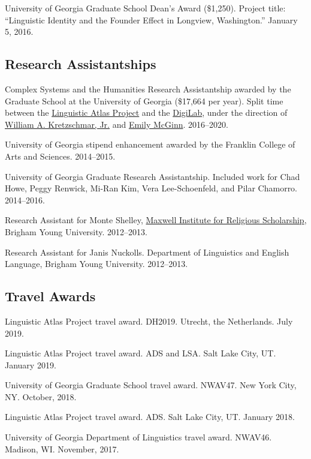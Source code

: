 \documentclass[
]{article}
\begin{document}
University of Georgia Graduate School Dean's Award (\$1,250). Project
title: ``Linguistic Identity and the Founder Effect in Longview,
Washington.'' January 5, 2016.

\hypertarget{research-assistantships}{%
\subsection{Research Assistantships}\label{research-assistantships}}

Complex Systems and the Humanities Research Assistantship awarded by the
Graduate School at the University of Georgia (\$17,664 per year). Split
time between the \href{http://www.lap.uga.edu}{Linguistic Atlas Project}
and the \href{http://digi.uga.edu/digilab/}{DigiLab}, under the
direction of
\href{https://www.english.uga.edu/directory/people/william-kretzschmar}{William
A. Kretzschmar, Jr.} and \href{https://emilymcginn.com}{Emily McGinn}.
2016--2020.

University of Georgia stipend enhancement awarded by the Franklin
College of Arts and Sciences. 2014--2015.

University of Georgia Graduate Research Assistantship. Included work for
Chad Howe, Peggy Renwick, Mi-Ran Kim, Vera Lee-Schoenfeld, and Pilar
Chamorro. 2014--2016.

Research Assistant for Monte Shelley, \href{https://mi.byu.edu}{Maxwell
Institute for Religious Scholarship}, Brigham Young University.
2012--2013.

Research Assistant for Janis Nuckolls. Department of Linguistics and
English Language, Brigham Young University. 2012--2013.

\hypertarget{travel-awards}{%
\subsection{Travel Awards}\label{travel-awards}}

Linguistic Atlas Project travel award. DH2019. Utrecht, the Netherlands.
July 2019.

Linguistic Atlas Project travel award. ADS and LSA. Salt Lake City, UT.
January 2019.

University of Georgia Graduate School travel award. NWAV47. New York
City, NY. October, 2018.

Linguistic Atlas Project travel award. ADS. Salt Lake City, UT. January
2018.

University of Georgia Department of Linguistics travel award. NWAV46.
Madison, WI. November, 2017.
\end{document}

